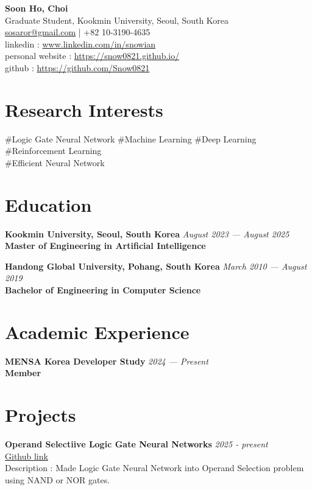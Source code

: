 \documentclass[11pt, a4paper]{article}
\newcommand{\itemheader}[2]{
    \noindent\textbf{#1} \hfill \textit{#2} \\
}
\begin{document}
{\huge \textbf{Soon Ho, Choi}}\\[0.1cm]
Graduate Student, Kookmin University, Seoul, South Korea \\
\href{mailto:sosaror@gmail.com}{sosaror@gmail.com} | +82 10-3190-4635 \\
linkedin : \href{https://www.linkedin.com/in/snowian}{www.linkedin.com/in/snowian} \\
personal website : \href{https://snow0821.github.io/}{https://snow0821.github.io/} \\
github : \href{https://github.com/Snow0821}{https://github.com/Snow0821}

\vspace{0.3cm}

\section*{Research Interests}
\noindent
\#Logic Gate Neural Network 
\#Machine Learning 
\#Deep Learning 
\#Reinforcement Learning \\
\#Efficient Neural Network

\section*{Education}
\itemheader{Kookmin University, Seoul, South Korea}{August 2023 — August 2025}
\textbf{Master of Engineering in Artificial Intelligence} \\

\vspace{0.3cm}

\itemheader{Handong Global University, Pohang, South Korea}{March 2010 — August 2019}
\textbf{Bachelor of Engineering in Computer Science} 

\section*{Academic Experience}
\itemheader{MENSA Korea Developer Study}{2024 — Present}
\textbf{Member}

\section*{Projects}
\itemheader{Operand Selectiive Logic Gate Neural Networks}{2025 - present}
\href{https://github.com/Snow0821/oslgn}{Github link}\\
Description : Made Logic Gate Neural Network into Operand Selection problem using NAND or NOR gates.\\
\end{document}
